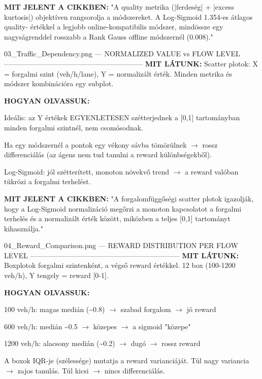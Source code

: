 \documentclass[11pt,a4paper]{article}
\begin{document}
\textbf{MIT JELENT A CIKKBEN:}
"A quality metrika (|ferdeség| + |excess kurtosis|) objektíven
rangsorolja a módszereket. A Log-Sigmoid 1.354-es átlagos quality-
értékkel a legjobb online-kompatibilis módszer, mindössze egy
nagyságrenddel rosszabb a Rank Gauss offline módszernél (0.008)."

03\_Traffic\_Dependency.png — NORMALIZED VALUE vs FLOW LEVEL
-----------------------------------------------------------
\textbf{MIT LÁTUNK:}
Scatter plotok: X = forgalmi szint (veh/h/lane), Y = normalizált érték.
Minden metrika és módszer kombinációra egy subplot.

\textbf{HOGYAN OLVASSUK:}
\par\noindent\hspace*{1em}\textbullet{} Ideális: az Y értékek EGYENLETESEN szétterjednek a [0,1] tartományban
minden forgalmi szintnél, nem csomósodnak.
\par\noindent\hspace*{1em}\textbullet{} Ha egy módszernél a pontok egy vékony sávba tömörülnek $\rightarrow$ rossz
differenciálás (az ágens nem tud tanulni a reward különbségekből).
\par\noindent\hspace*{1em}\textbullet{} Log-Sigmoid: jól szétterített, monoton növekvő trend $\rightarrow$ a reward
valóban tükrözi a forgalmi terhelést.

\textbf{MIT JELENT A CIKKBEN:}
"A forgalomfüggőségi scatter plotok igazolják, hogy a Log-Sigmoid
normalizáció megőrzi a monoton kapcsolatot a forgalmi terhelés és
a normalizált érték között, miközben a teljes [0,1] tartományt
kihasználja."

04\_Reward\_Comparison.png — REWARD DISTRIBUTION PER FLOW LEVEL
---------------------------------------------------------------
\textbf{MIT LÁTUNK:}
Boxplotok forgalmi szintenként, a végső reward értékkel.
12 box (100-1200 veh/h), Y tengely = reward [0-1].

\textbf{HOGYAN OLVASSUK:}
\par\noindent\hspace*{1em}\textbullet{} 100 veh/h: magas medián (\textasciitilde{}0.8) $\rightarrow$ szabad forgalom $\rightarrow$ jó reward
\par\noindent\hspace*{1em}\textbullet{} 600 veh/h: medián \textasciitilde{}0.5 $\rightarrow$ közepes $\rightarrow$ a sigmoid "közepe"
\par\noindent\hspace*{1em}\textbullet{} 1200 veh/h: alacsony medián (\textasciitilde{}0.2) $\rightarrow$ dugó $\rightarrow$ rossz reward
\par\noindent\hspace*{1em}\textbullet{} A boxok IQR-je (szélessége) mutatja a reward varianciáját.
Túl nagy variancia $\rightarrow$ zajos tanulás. Túl kicsi $\rightarrow$ nincs differenciálás.
\end{document}
